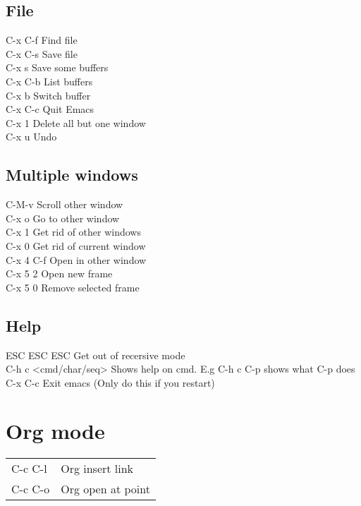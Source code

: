 \documentclass[11pt]{article}
\begin{document}
\subsection{File}
\label{sec:orgdb56b72}
C-x C-f		Find file\\
C-x C-s		Save file\\
C-x s		Save some buffers\\
C-x C-b		List buffers\\
C-x b		Switch buffer\\
C-x C-c		Quit Emacs\\
C-x 1		Delete all but one window\\
C-x u		Undo\\


\subsection{Multiple windows}
\label{sec:orgb8f96f5}
C-M-v             Scroll other window\\
C-x o             Go to other window\\
C-x 1             Get rid of other windows\\
C-x 0             Get rid of current window\\
C-x 4 C-f         Open in other window\\
C-x 5 2           Open new frame\\
C-x 5 0           Remove selected frame\\

\subsection{Help}
\label{sec:orgd0ef535}
ESC ESC ESC       Get out of recersive mode\\
C-h c <cmd/char/seq>   Shows help on cmd. E.g C-h c C-p shows what C-p does\\
C-x C-c           Exit emacs (Only do this if you restart)\\

\section{Org mode}
\label{sec:org687ff94}
\begin{center}
\begin{tabular}{ll}
\hline
C-c C-l & Org insert link\\
C-c C-o & Org open at point\\
\hline
\end{tabular}
\end{center}
\end{document}
